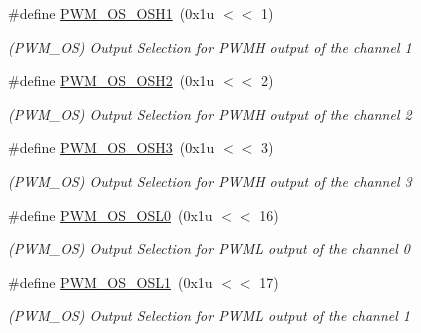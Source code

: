 \begin{DoxyCompactItemize}
\mbox{\label{group__SAMV71__PWM_gaf2d959066b2b74f028b75b4cef458006}} 
\#define \mbox{\hyperlink{group__SAMV71__PWM_gaf2d959066b2b74f028b75b4cef458006}{P\+W\+M\+\_\+\+O\+S\+\_\+\+O\+S\+H1}}~(0x1u $<$$<$ 1)
\begin{DoxyCompactList}\small\item\em (P\+W\+M\+\_\+\+OS) Output Selection for P\+W\+MH output of the channel 1 \end{DoxyCompactList}\item 
\mbox{\label{group__SAMV71__PWM_ga6ea1c76332c521897e0888298fa86f28}} 
\#define \mbox{\hyperlink{group__SAMV71__PWM_ga6ea1c76332c521897e0888298fa86f28}{P\+W\+M\+\_\+\+O\+S\+\_\+\+O\+S\+H2}}~(0x1u $<$$<$ 2)
\begin{DoxyCompactList}\small\item\em (P\+W\+M\+\_\+\+OS) Output Selection for P\+W\+MH output of the channel 2 \end{DoxyCompactList}\item 
\mbox{\label{group__SAMV71__PWM_gabb61ef4930de967d5130142686da648a}} 
\#define \mbox{\hyperlink{group__SAMV71__PWM_gabb61ef4930de967d5130142686da648a}{P\+W\+M\+\_\+\+O\+S\+\_\+\+O\+S\+H3}}~(0x1u $<$$<$ 3)
\begin{DoxyCompactList}\small\item\em (P\+W\+M\+\_\+\+OS) Output Selection for P\+W\+MH output of the channel 3 \end{DoxyCompactList}\item 
\mbox{\label{group__SAMV71__PWM_gac5e0b471cd3204dfae585a01b6a1e851}} 
\#define \mbox{\hyperlink{group__SAMV71__PWM_gac5e0b471cd3204dfae585a01b6a1e851}{P\+W\+M\+\_\+\+O\+S\+\_\+\+O\+S\+L0}}~(0x1u $<$$<$ 16)
\begin{DoxyCompactList}\small\item\em (P\+W\+M\+\_\+\+OS) Output Selection for P\+W\+ML output of the channel 0 \end{DoxyCompactList}\item 
\mbox{\label{group__SAMV71__PWM_ga115f4e7c105beaee094189329a78b554}} 
\#define \mbox{\hyperlink{group__SAMV71__PWM_ga115f4e7c105beaee094189329a78b554}{P\+W\+M\+\_\+\+O\+S\+\_\+\+O\+S\+L1}}~(0x1u $<$$<$ 17)
\begin{DoxyCompactList}\small\item\em (P\+W\+M\+\_\+\+OS) Output Selection for P\+W\+ML output of the channel 1 \end{DoxyCompactList}\item 
$$
\end{DoxyCompactItemize}
